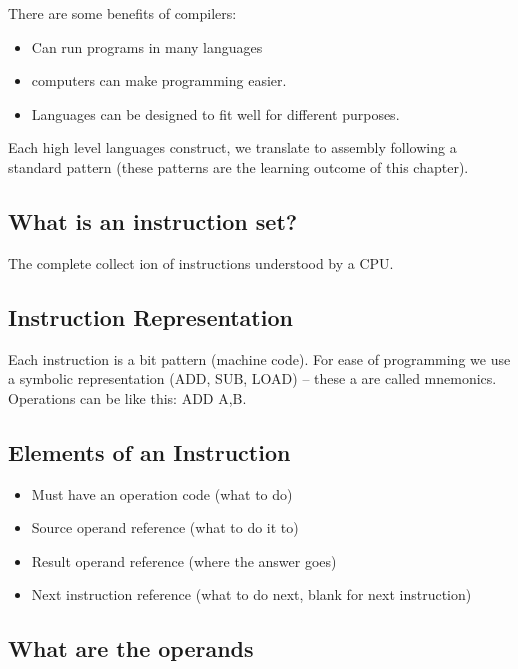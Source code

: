 There are some benefits of compilers:
\begin{itemize}
	\item Can run programs in many languages
	\item computers can make programming easier.
	\item Languages can be designed to fit well for different purposes.
\end{itemize}

Each high level languages construct, we translate to assembly following a standard pattern (these patterns are the learning outcome of this chapter).

\subsection{What is an instruction set?}\label{sub:what_is_an_instruction_set_}

The complete collect ion of instructions understood by a CPU.

\subsection{Instruction Representation}\label{sub:instruction_representation}

Each instruction is a bit pattern (machine code).
For ease of programming we use a symbolic representation (ADD, SUB, LOAD) -- these a are called mnemonics.
Operations can be like this: ADD A,B.

\subsection{Elements of an Instruction}\label{sub:elements_of_an_instruction}

\begin{itemize}
	\item Must have an operation code (what to do)
	\item Source operand reference (what to do it to)
	\item Result operand reference (where the answer goes)
	\item Next instruction reference (what to do next, blank for next instruction)
\end{itemize}

\subsection{What are the operands}\label{sub:what_are_the_operands}

